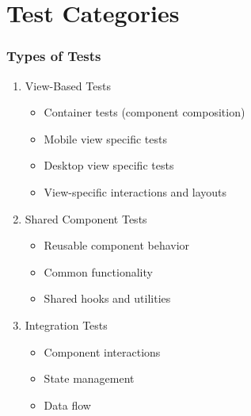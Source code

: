 \documentclass{beamer}
\begin{document}
\section{Test Categories}
\begin{frame}
    \frametitle{Types of Tests}
    \begin{enumerate}
        \item View-Based Tests
        \begin{itemize}
            \item Container tests (component composition)
            \item Mobile view specific tests
            \item Desktop view specific tests
            \item View-specific interactions and layouts
        \end{itemize}
        \pause
        \item Shared Component Tests
        \begin{itemize}
            \item Reusable component behavior
            \item Common functionality
            \item Shared hooks and utilities
        \end{itemize}
        \pause
        \item Integration Tests
        \begin{itemize}
            \item Component interactions
            \item State management
            \item Data flow
        \end{itemize}
    \end{enumerate}
\end{frame}
\end{document}
